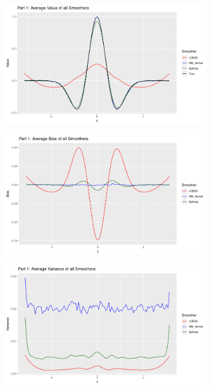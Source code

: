 \documentclass[12pt,letterpaper]{article}
\begin{document}
\begin{figure}[!htp]
    \caption{Results from Part 1, equidistant point set}
    \centering
    \begin{subfigure}{0.45\textwidth}
      \includegraphics[width=\textwidth]{p1_value}
    \end{subfigure}
    \begin{subfigure}{0.45\textwidth}
      \includegraphics[width=\textwidth]{p1_bias}
    \end{subfigure}
    \begin{subfigure}{0.45\textwidth}
      \includegraphics[width=\textwidth]{p1_var}

\end{subfigure}
\end{figure}
\end{document}
